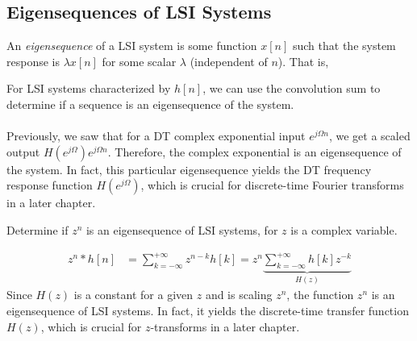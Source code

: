 \documentclass{report}
\begin{document}
\subsection{Eigensequences of LSI Systems}
An \emph{eigensequence} of a LSI system is some function $x[n]$ such that the system response is $\lambda x[n]$ for some scalar $\lambda$ (independent of $n$). That is,  
\begin{center}
\end{center}
For LSI systems characterized by $h[n]$, we can use the convolution sum to determine if a sequence 
is an eigensequence of the system. 
\\ \\
Previously, we saw that for a DT complex exponential input $e^{j\Omega n}$, 
we get a scaled output $H(e^{j\Omega})e^{j\Omega n}$. Therefore, the complex exponential is an eigensequence of the system. 
In fact, this particular eigensequence yields the DT frequency response function $H(e^{j\Omega})$, which is crucial for discrete-time Fourier transforms 
in a later chapter.

\begin{example}
    Determine if $z^n$ is an eigensequence of LSI systems, for $z$ is a complex variable.
\end{example}
\begin{solution}
    \begin{align*}
        z^n * h[n] &= \sum_{k=-\infty}^{+\infty} z^{n-k}h[k] = z^n \underbrace{\sum_{k=-\infty}^{+\infty} h[k]z^{-k} }_\textrm{$H(z)$}
    \end{align*}
    Since $H(z)$ is a constant for a given $z$ and is scaling $z^n$, the function $z^n$ is an eigensequence of LSI systems. 
    In fact, it yields the discrete-time transfer function $H(z)$, which is crucial for $z$-transforms in a later chapter.
    \\ \\ 
    \begin{center}
    \end{center}
\end{solution}
\end{document}
